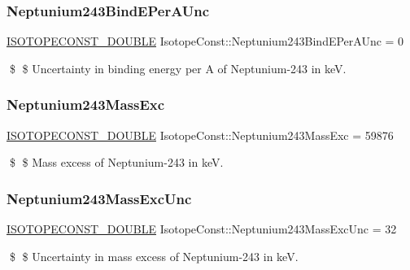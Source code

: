\subsubsection{\texorpdfstring{Neptunium243\+Bind\+E\+Per\+A\+Unc}{Neptunium243BindEPerAUnc}}
{\footnotesize\ttfamily \mbox{\hyperlink{group___isotope_const-_macros_ga8f45a7272ce02c0b4c65c44636ed719a}{I\+S\+O\+T\+O\+P\+E\+C\+O\+N\+S\+T\+\_\+\+D\+O\+U\+B\+LE}} Isotope\+Const\+::\+Neptunium243\+Bind\+E\+Per\+A\+Unc = 0}

\$ \$ Uncertainty in binding energy per A of Neptunium-\/243 in keV. \mbox{\label{group___isotope_const-_neptunium-_np243_gaf76927dd805144b1bdd1de832ce816ef}} 
\subsubsection{\texorpdfstring{Neptunium243\+Mass\+Exc}{Neptunium243MassExc}}
{\footnotesize\ttfamily \mbox{\hyperlink{group___isotope_const-_macros_ga8f45a7272ce02c0b4c65c44636ed719a}{I\+S\+O\+T\+O\+P\+E\+C\+O\+N\+S\+T\+\_\+\+D\+O\+U\+B\+LE}} Isotope\+Const\+::\+Neptunium243\+Mass\+Exc = 59876}

\$ \$ Mass excess of Neptunium-\/243 in keV. \mbox{\label{group___isotope_const-_neptunium-_np243_ga6426fcd2a44238b4c86ba8fb218e9111}} 
\subsubsection{\texorpdfstring{Neptunium243\+Mass\+Exc\+Unc}{Neptunium243MassExcUnc}}
{\footnotesize\ttfamily \mbox{\hyperlink{group___isotope_const-_macros_ga8f45a7272ce02c0b4c65c44636ed719a}{I\+S\+O\+T\+O\+P\+E\+C\+O\+N\+S\+T\+\_\+\+D\+O\+U\+B\+LE}} Isotope\+Const\+::\+Neptunium243\+Mass\+Exc\+Unc = 32}

\$ \$ Uncertainty in mass excess of Neptunium-\/243 in keV. \mbox{\label{group___isotope_const-_neptunium-_np243_gab67441dfaa0664ad3c9c5127a55402e2}} 
